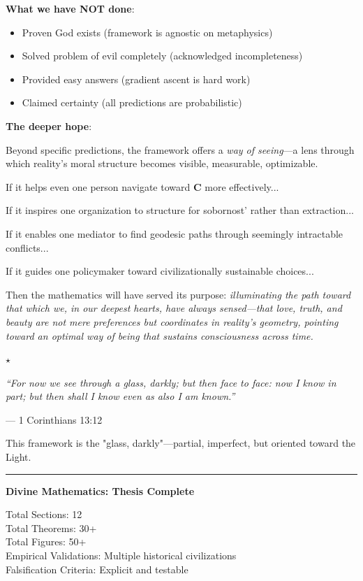 \documentclass[11pt,a4paper]{article}
\theoremstyle{definition}
\theoremstyle{remark}
\begin{document}
\begin{enumerate}
\textbf{What we have NOT done}:
\begin{itemize}
    \item Proven God exists (framework is agnostic on metaphysics)
    \item Solved problem of evil completely (acknowledged incompleteness)
    \item Provided easy answers (gradient ascent is hard work)
    \item Claimed certainty (all predictions are probabilistic)
\end{itemize}

\textbf{The deeper hope}:

Beyond specific predictions, the framework offers a \textit{way of seeing}—a lens through which reality's moral structure becomes visible, measurable, optimizable.

If it helps even one person navigate toward \(\mathbf{C}\) more effectively...

If it inspires one organization to structure for sobornost' rather than extraction...

If it enables one mediator to find geodesic paths through seemingly intractable conflicts...

If it guides one policymaker toward civilizationally sustainable choices...

Then the mathematics will have served its purpose: \textit{illuminating the path toward that which we, in our deepest hearts, have always sensed—that love, truth, and beauty are not mere preferences but coordinates in reality's geometry, pointing toward an optimal way of being that sustains consciousness across time.}

\begin{center}
\(\star\)
\end{center}

\textit{``For now we see through a glass, darkly; but then face to face: now I know in part; but then shall I know even as also I am known.''} 

— 1 Corinthians 13:12

This framework is the "glass, darkly"—partial, imperfect, but oriented toward the Light.

\begin{center}
\rule{0.5\linewidth}{0.5pt}

\textbf{Divine Mathematics: Thesis Complete}

Total Sections: 12\\
Total Theorems: 30+\\
Total Figures: 50+\\
Empirical Validations: Multiple historical civilizations\\
Falsification Criteria: Explicit and testable


\end{center}
\end{enumerate}
\end{document}
